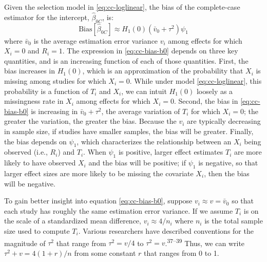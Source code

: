 \documentclass[
]{article}
\begin{document}
Given the selection model in \eqref{eq:cc-loglinear}, the bias of the complete-case estimator for the intercept, \(\hat{\beta}_{0C}\), is:
\begin{equation}
\text{Bias}[\hat{\beta}_{0C}] 
  \approx H_1(0)(\bar{v}_0 + \tau^2)\psi_1
\label{eq:cc-bias-b0}
\end{equation}
where \(\bar{v}_0\) is the average estimation error variance \(v_i\) among effects for which \(X_i = 0\) and \(R_i = 1\).
The expression in \eqref{eq:cc-bias-b0} depends on three key quantities, and is an increasing function of each of those quantities.
First, the bias increases in \(H_1(0)\), which is an approximation of the probability that \(X_i\) is missing among studies for which \(X_i = 0\).
While under model \eqref{eq:cc-loglinear}, this probability is a function of \(T_i\) and \(X_i\), we can intuit \(H_1(0)\) loosely as a missingness rate in \(X_i\) among effects for which \(X_i = 0\).
Second, the bias in \eqref{eq:cc-bias-b0} is increasing in \(\bar{v}_0 + \tau^2\), the average variation of \(T_i\) for which \(X_i = 0\); the greater the variation, the greater the bias.
Because the \(v_i\) are typically decreasing in sample size, if studies have smaller samples, the bias will be greater.
Finally, the bias depends on \(\psi_1\), which characterizes the relationship between an \(X_i\) being observed (i.e., \(R_i\)) and \(T_i\).
When \(\psi_1\) is positive, larger effect estimates \(T_i\) are more likely to have observed \(X_i\) and the bias will be positive; if \(\psi_1\) is negative, so that larger effect sizes are more likely to be missing the covariate \(X_i\), then the bias will be negative.

To gain better insight into equation \eqref{eq:cc-bias-b0}, suppose \(v_i \approx v = \bar{v}_0\) so that each study has roughly the same estimation error variance.
If we assume \(T_i\) is on the scale of a standardized mean difference, \(v_i \approx 4/n_i\) where \(n_i\) is the total sample size used to compute \(T_i\).
Various researchers have described conventions for the magnitude of \(\tau^2\) that range from \(\tau^2 = v/4\) to \(\tau^2 = v\).\textsuperscript{37--39}
Thus, we can write \(\tau^2 + v = 4(1 + r)/n\) from some constant \(r\) that ranges from 0 to 1.
\end{document}
